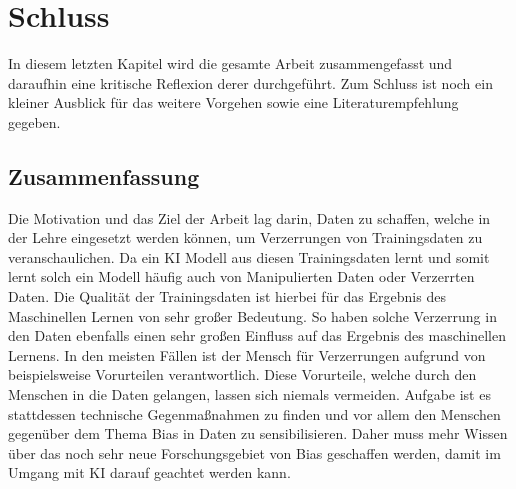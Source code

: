 \chapter{Schluss}
\label{sec:schluss}
\begin{onehalfspace}
    In diesem letzten Kapitel wird die gesamte Arbeit zusammengefasst und daraufhin eine kritische Reflexion derer durchgeführt. Zum Schluss ist noch ein kleiner Ausblick für das weitere Vorgehen sowie eine Literaturempfehlung gegeben.
\section{Zusammenfassung}
\label{zusammenfassung}
Die Motivation und das Ziel der Arbeit lag darin, Daten zu schaffen, welche in der Lehre eingesetzt werden können, um Verzerrungen von Trainingsdaten zu veranschaulichen. Da ein \ac{KI} Modell aus diesen Trainingsdaten lernt und somit lernt solch ein Modell häufig auch von Manipulierten Daten oder Verzerrten Daten. Die Qualität der Trainingsdaten ist hierbei für das Ergebnis des Maschinellen Lernen von sehr großer Bedeutung. So haben solche Verzerrung in den Daten ebenfalls einen sehr großen Einfluss auf das Ergebnis des maschinellen Lernens. In den meisten Fällen ist der Mensch für Verzerrungen aufgrund von beispielsweise Vorurteilen verantwortlich. Diese Vorurteile, welche durch den Menschen in die Daten gelangen, lassen sich niemals vermeiden. Aufgabe ist es stattdessen technische Gegenmaßnahmen zu finden und vor allem den Menschen gegenüber dem Thema Bias in Daten zu sensibilisieren. Daher muss mehr Wissen über das noch sehr neue Forschungsgebiet von Bias geschaffen werden, damit im Umgang mit KI darauf geachtet werden kann.\\

\end{onehalfspace}
